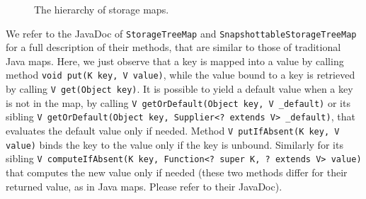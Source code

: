 \begin{figure}[th]
\begin{center}
  \end{center}
  \caption{The hierarchy of storage maps.}
  \label{fig:maps_hierarchy}
\end{figure}

We refer to the JavaDoc of \texttt{StorageTreeMap} and \texttt{SnapshottableStorageTreeMap}
for a full description of their methods,
that are similar to those of traditional Java maps. Here, we just observe
that a key is mapped into a value by calling method
\texttt{void put(K key, V value)}, while the value bound to a key is retrieved by calling
\texttt{V get(Object key)}. It is possible to yield a default value when a key is not
in the map, by calling \texttt{V getOrDefault(Object key, V \_default)} or
its sibling \texttt{V getOrDefault(Object key, Supplier<? extends V> \_default)}, that
evaluates the default value only if needed. Method \texttt{V putIfAbsent(K key, V value)}
binds the key to the value only if the key is unbound. Similarly for
its sibling \texttt{V computeIfAbsent(K key, Function<? super K, ? extends V> value)} that computes
the new value only if needed (these two methods differ for their
returned value, as in Java maps. Please refer to their JavaDoc).

